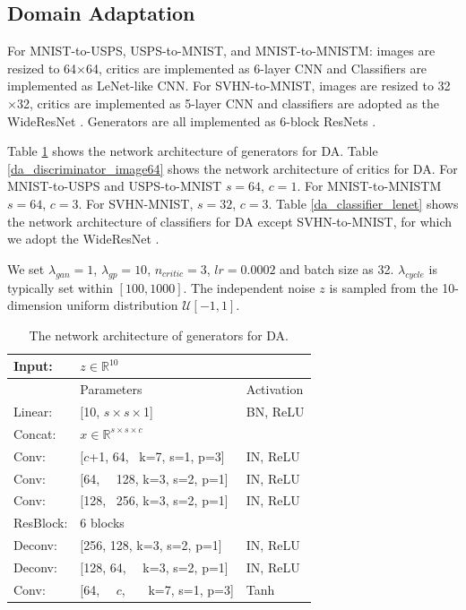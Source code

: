 \documentclass[runningheads]{llncs}
\begin{document}
\subsection{Domain Adaptation}
\label{hyperparameters_da}

For MNIST-to-USPS, USPS-to-MNIST, and MNIST-to-MNISTM: images are resized to 64$\times$64, 
critics are implemented as 6-layer CNN and 
Classifiers are implemented as LeNet-like CNN. 
For SVHN-to-MNIST, images are resized to 32$\times$32, 
critics are implemented as 5-layer CNN and 
classifiers are adopted as the WideResNet \cite{wideresnet}. 
Generators are all implemented as 6-block ResNets \cite{resnet}. 

Table \ref{da_generator_resnet6} shows the network architecture of generators for DA. 
Table \ref{da_discriminator_image64} shows the network architecture of critics for DA. 	
For MNIST-to-USPS and USPS-to-MNIST $s=64$, $c=1$. For MNIST-to-MNISTM $s=64$, $c=3$. For SVHN-MNIST, $s=32$, $c=3$. 	
Table \ref{da_classifier_lenet} shows the network architecture of classifiers for DA except SVHN-to-MNIST, for which we adopt the WideResNet \cite{wideresnet}. 

We set $\lambda_{gan}=1$, $\lambda_{gp}=10$, $n_{critic}=3$, $lr=0.0002$ and batch size as 32. $\lambda_{cycle}$ is typically set within $[100, 1000]$. The independent noise $z$ is sampled from the 10-dimension uniform distribution $\mathcal{U}[-1, 1]$.

\begin{table}
	\vspace{-20pt}
	\centering
	\caption{The network architecture of generators for DA.}
	\vspace{3pt}
	\begin{tabular}{lll}
		\toprule[2pt]
		Input: & $z \in \mathbb{R}^{10}$ &\\
		\hline
		& Parameters & Activation\\
		\hline
		Linear: & [10, $s\times s\times$1] & BN, ReLU \\
		\hline
		Concat: & $x \in \mathbb{R}^{s\times s\times c}$ \\
		\hline 
		Conv: & [$c$+1, 64, ~k=7, s=1, p=3] & IN, ReLU \\
		\hline
		Conv: & [64, ~~128, k=3, s=2, p=1] & IN, ReLU \\
		\hline
		Conv: & [128, ~256, k=3, s=2, p=1] & IN, ReLU \\
		\hline 
		ResBlock: & 6 blocks \\
		\hline 
		Deconv: & [256, 128, k=3, s=2, p=1] & IN, ReLU \\
		\hline
		Deconv: & [128, 64, ~~k=3, s=2, p=1] & IN, ReLU \\
		\hline
		Conv: & [64, ~~$c$, ~~~k=7, s=1, p=3] & Tanh \\
		\bottomrule[2pt]
	\end{tabular}
	\label{da_generator_resnet6}
\end{table}
\end{document}
